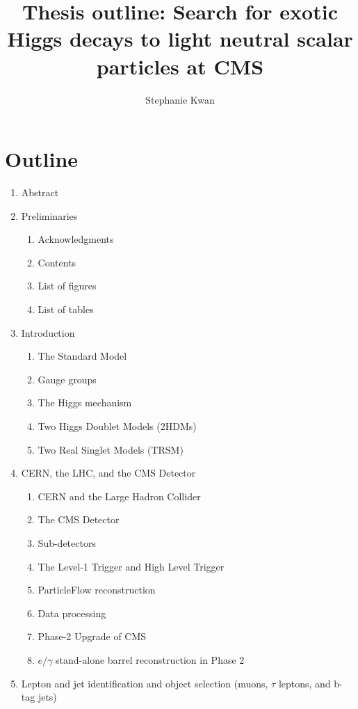 \documentclass{article}
\title{Thesis outline: Search for exotic Higgs decays to light neutral scalar particles at CMS}
\author{Stephanie Kwan}
\begin{document}
\maketitle

\section{Outline}

\begin{enumerate}
    \item Abstract
    \item Preliminaries
        \begin{enumerate}
            \item Acknowledgments
            \item Contents
            \item List of figures
            \item List of tables
        \end{enumerate}
    \item Introduction
        \begin{enumerate}
            \item The Standard Model
            \item Gauge groups
            \item The Higgs mechanism
            \item Two Higgs Doublet Models (2HDMs)
            \item Two Real Singlet Models (TRSM)
        \end{enumerate}
    \item CERN, the LHC, and the CMS Detector
        \begin{enumerate}
            \item CERN and the Large Hadron Collider
            \item The CMS Detector
            \item Sub-detectors
            \item The Level-1 Trigger and High Level Trigger
            \item ParticleFlow reconstruction
            \item Data processing 
            \item Phase-2 Upgrade of CMS
            \item $e/\gamma$ stand-alone barrel reconstruction in Phase 2
        \end{enumerate}
    \item Lepton and jet identification and object selection (muons, $\tau$ leptons, and b-tag jets)

\end{enumerate}
\end{document}
